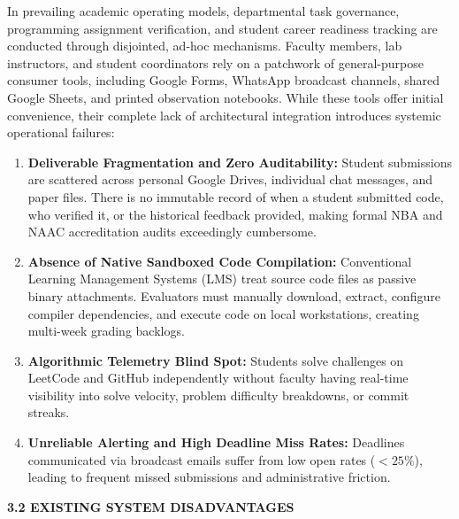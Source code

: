 {\fontsize{12pt}{17.5pt}\selectfont
In prevailing academic operating models, departmental task governance, programming assignment verification, and student career readiness tracking are conducted through disjointed, ad-hoc mechanisms. Faculty members, lab instructors, and student coordinators rely on a patchwork of general-purpose consumer tools, including Google Forms, WhatsApp broadcast channels, shared Google Sheets, and printed observation notebooks. While these tools offer initial convenience, their complete lack of architectural integration introduces systemic operational failures:

\begin{enumerate}[noitemsep,topsep=2pt,leftmargin=*]
  \item \textbf{Deliverable Fragmentation and Zero Auditability:} Student submissions are scattered across personal Google Drives, individual chat messages, and paper files. There is no immutable record of when a student submitted code, who verified it, or the historical feedback provided, making formal NBA and NAAC accreditation audits exceedingly cumbersome.
  \item \textbf{Absence of Native Sandboxed Code Compilation:} Conventional Learning Management Systems (LMS) treat source code files as passive binary attachments. Evaluators must manually download, extract, configure compiler dependencies, and execute code on local workstations, creating multi-week grading backlogs.
  \item \textbf{Algorithmic Telemetry Blind Spot:} Students solve challenges on LeetCode and GitHub independently without faculty having real-time visibility into solve velocity, problem difficulty breakdowns, or commit streaks.
  \item \textbf{Unreliable Alerting and High Deadline Miss Rates:} Deadlines communicated via broadcast emails suffer from low open rates ($< 25\%$), leading to frequent missed submissions and administrative friction.
\end{enumerate}

\vspace{0.4cm}
{\fontsize{14pt}{18pt}\selectfont\bfseries 3.2 EXISTING SYSTEM DISADVANTAGES\par}
\vspace{0.3cm}

}
